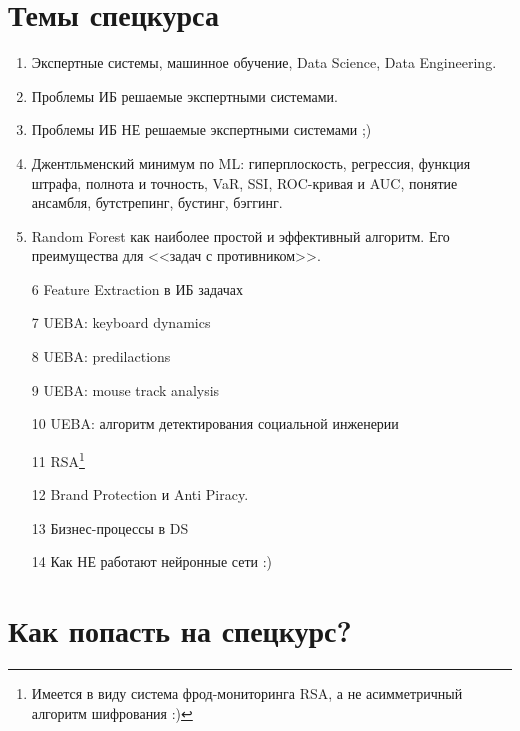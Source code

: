   \section{Темы спецкурса}\label{section:topics}
  
  \begin{frame}
	\begin{enumerate}
	\item Экспертные системы, машинное обучение, Data Science, Data Engineering.
	\item Проблемы ИБ решаемые экспертными системами.
	\item Проблемы ИБ НЕ решаемые экспертными системами ;)
	\item Джентльменский минимум по ML: гиперплоскость, регрессия, функция штрафа, полнота и точность, VaR, SSI, ROC-кривая и AUC, понятие ансамбля, бутстрепинг, бустинг, бэггинг.
	\item Random Forest как наиболее простой и эффективный алгоритм. Его преимущества для 
	<<задач с противником>>.
	\item[6] Feature Extraction в ИБ задачах
	\end{enumerate}
\end{frame}

  \begin{frame}
\begin{enumerate}
	\item[7] UEBA: keyboard dynamics
	\item[8] UEBA: predilactions
	\item[9] UEBA: mouse track analysis
	\item[10] UEBA: алгоритм детектирования социальной инженерии
	\item[11] RSA\footnote{Имеется в виду система фрод-мониторинга RSA, а не асимметричный алгоритм шифрования :)} 
	\item[12] Brand Protection и Anti Piracy.
	\item[13] Бизнес-процессы в DS
	\item[14] Как НЕ работают нейронные сети :)
\end{enumerate}
\end{frame}

  \section{Как попасть на спецкурс?}\label{section:how_to}
  
